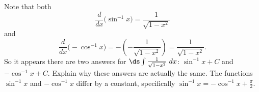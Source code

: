 {Note that both $$ \frac{d}{dx}\big(\sin^{-1}x\big)=\frac{1}{\sqrt{1-x^2}}$$ and $$\frac{d}{dx}\big(-\cos^{-1}x\big)=-\left(-\frac{1}{\sqrt{1-x^2}}\right)=\frac{1}{\sqrt{1-x^2}}.$$  So it appears there are two answers for $\ds \int\frac{1}{\sqrt{1-x^2}}\ dx$: $\sin^{-1}x +C$ and $-\cos^{-1}x+C$.  Explain why these answers are actually the same.
}
{The functions $\sin^{-1}x$ and $-\cos^{-1}x$ differ by a constant, specifically $\sin^{-1}x= - \cos^{-1}x + \frac{\pi}{2}$.
}

